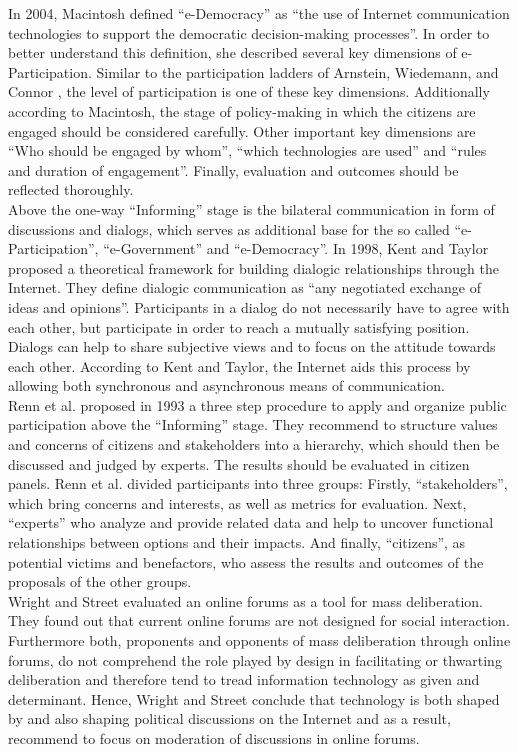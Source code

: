 In 2004, Macintosh \cite{Macintosh2004_eParticipation_characterization} defined ``e-Democracy'' as ``the use of Internet communication technologies to support the democratic decision-making processes''. In order to better understand this definition, she described several key dimensions of e-Participation. Similar to the participation ladders of Arnstein, Wiedemann, and Connor \cite{Arnstein1969_citizen_participation,Wiedemann1993355,Connor1988_new_ladder}, the level of participation is one of these key dimensions. Additionally according to Macintosh, the stage of policy-making in which the citizens are engaged should be considered carefully. Other important key dimensions are ``Who should be engaged by whom'', ``which technologies are used'' and ``rules and duration of engagement''. Finally, evaluation and outcomes should be reflected thoroughly.\\
Above the one-way ``Informing'' stage is the bilateral communication in form of discussions and dialogs, which serves as additional base for the so called ``e-Participation'', ``e-Government'' and ``e-Democracy''. In 1998, Kent and Taylor \cite{Kent1998_dialogic_relationships_through_www} proposed a theoretical framework for building dialogic relationships through the Internet. They define dialogic communication as ``any negotiated exchange of ideas and opinions''. Participants in a dialog do not necessarily have to agree with each other, but participate in order to reach a mutually satisfying position. Dialogs can help to share subjective views and to focus on the attitude towards each other. According to Kent and Taylor, the Internet aids this process by allowing both synchronous and asynchronous means of communication.\\
Renn et al. \cite{Renn1993_participation} proposed in 1993 a three step procedure to apply and organize public participation above the ``Informing'' stage. They recommend to structure values and concerns of citizens and stakeholders into a hierarchy, which should then be discussed and judged by experts. The results should be evaluated in citizen panels. Renn et al. divided participants into three groups: Firstly, ``stakeholders'', which bring concerns and interests, as well as metrics for evaluation. Next, ``experts'' who analyze and provide related data and help to uncover functional relationships between options and their impacts. And finally, ``citizens'', as potential victims and benefactors, who assess the results and outcomes of the proposals of the other groups.\\
Wright and Street \cite{Wright2007_deliberation_design} evaluated an online forums as a tool for mass deliberation. They found out that current online forums are not designed for social interaction. Furthermore both, proponents and opponents of mass deliberation through online forums, do not comprehend the role played by design in facilitating or thwarting deliberation and therefore tend to tread information technology as given and determinant. Hence, Wright and Street conclude that technology is both shaped by and also shaping political discussions on the Internet and as a result, recommend to focus on moderation of discussions in online forums.\\
